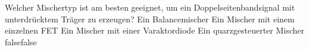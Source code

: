     {Welcher Mischertyp ist am besten geeignet, um ein Doppelseitenbandsignal mit unterdrücktem Träger zu erzeugen?}
    {Ein Balancemischer}
    {Ein Mischer mit einem einzelnen FET}
    {Ein Mischer mit einer Varaktordiode}
    {Ein quarzgesteuerter Mischer}
    {false}{false}